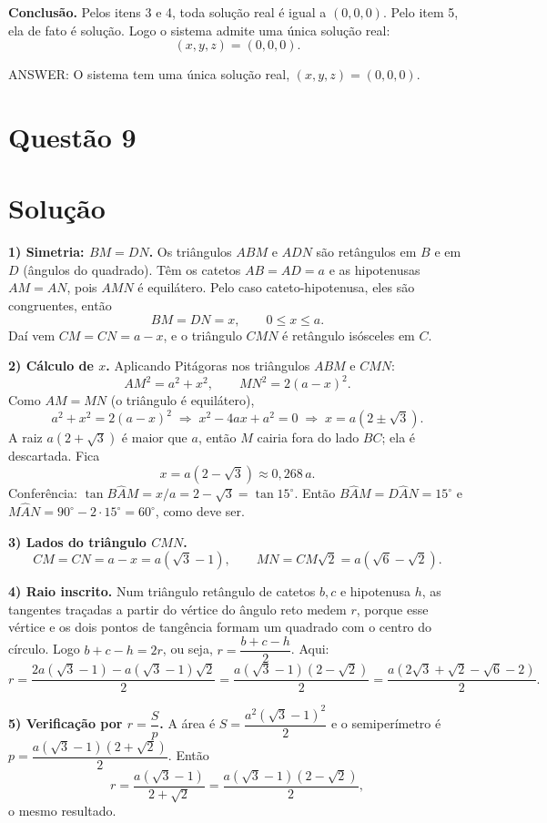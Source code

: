 \documentclass{article}%
\begin{document}
\textbf{Conclusão.} Pelos itens 3 e 4, toda solução real é igual a $(0,0,0)$. Pelo item 5, ela de fato é solução. Logo o sistema admite uma única solução real:
\[
(x,y,z)=(0,0,0).
\]

ANSWER: O sistema tem uma única solução real, $(x,y,z)=(0,0,0)$.%
\newpage%
\section*{Questão 9}

\section*{Solução}

\textbf{1) Simetria: $BM = DN$.} Os triângulos $ABM$ e $ADN$ são retângulos em $B$ e em $D$ (ângulos do quadrado). Têm os catetos $AB = AD = a$ e as hipotenusas $AM = AN$, pois $AMN$ é equilátero. Pelo caso cateto-hipotenusa, eles são congruentes, então
\[
BM = DN = x, \qquad 0 \le x \le a .
\]
Daí vem $CM = CN = a - x$, e o triângulo $CMN$ é retângulo isósceles em $C$.

\textbf{2) Cálculo de $x$.} Aplicando Pitágoras nos triângulos $ABM$ e $CMN$:
\[
AM^2 = a^2 + x^2, \qquad MN^2 = 2(a-x)^2 .
\]
Como $AM = MN$ (o triângulo é equilátero),
\[
a^2 + x^2 = 2(a-x)^2 \;\Longrightarrow\; x^2 - 4ax + a^2 = 0 \;\Longrightarrow\; x = a\left(2 \pm \sqrt{3}\right).
\]
A raiz $a(2+\sqrt{3})$ é maior que $a$, então $M$ cairia fora do lado $BC$; ela é descartada. Fica
\[
x = a\left(2-\sqrt{3}\right) \approx 0{,}268\,a .
\]
Conferência: $\tan B\hat{A}M = x/a = 2-\sqrt{3} = \tan 15^\circ$. Então $B\hat{A}M = D\hat{A}N = 15^\circ$ e $M\hat{A}N = 90^\circ - 2\cdot 15^\circ = 60^\circ$, como deve ser.

\textbf{3) Lados do triângulo $CMN$.}
\[
CM = CN = a - x = a\left(\sqrt{3}-1\right), \qquad MN = CM\sqrt{2} = a\left(\sqrt{6}-\sqrt{2}\right).
\]

\textbf{4) Raio inscrito.} Num triângulo retângulo de catetos $b, c$ e hipotenusa $h$, as tangentes traçadas a partir do vértice do ângulo reto medem $r$, porque esse vértice e os dois pontos de tangência formam um quadrado com o centro do círculo. Logo $b + c - h = 2r$, ou seja, $r = \dfrac{b+c-h}{2}$. Aqui:
\[
r = \frac{2a\left(\sqrt{3}-1\right) - a\left(\sqrt{3}-1\right)\sqrt{2}}{2}
= \frac{a\left(\sqrt{3}-1\right)\left(2-\sqrt{2}\right)}{2}
= \frac{a\left(2\sqrt{3}+\sqrt{2}-\sqrt{6}-2\right)}{2}.
\]

\textbf{5) Verificação por $r = \dfrac{S}{p}$.} A área é $S = \dfrac{a^2(\sqrt{3}-1)^2}{2}$ e o semiperímetro é $p = \dfrac{a(\sqrt{3}-1)(2+\sqrt{2})}{2}$. Então
\[
r = \frac{a(\sqrt{3}-1)}{2+\sqrt{2}} = \frac{a(\sqrt{3}-1)(2-\sqrt{2})}{2},
\]
o mesmo resultado.
\end{document}
